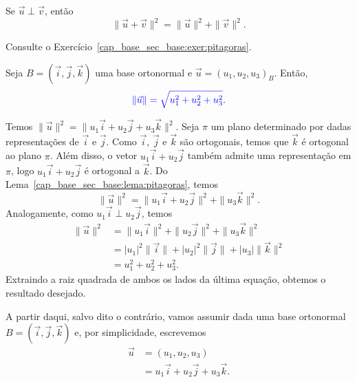\begin{lema}\label{cap_base_sec_base:lema:pitagoras}
  Se $\vec{u}\perp\vec{v}$, então 
  \begin{equation}
    \|\vec{u}+\vec{v}\|^2=\|\vec{u}\|^2+\|\vec{v}\|^2.
  \end{equation}
\end{lema}
\begin{demonstracao}
  Consulte o Exercício~\ref{cap_base_sec_base:exer:pitagoras}.
\end{demonstracao}

\begin{prop}\label{cap_base_sec_base:prop:norma}
  Seja $B = (\vec{i},\vec{j},\vec{k})$ uma base ortonormal e $\vec{u}=(u_1,u_2,u_3)_B$. Então, 
  \begin{equation}\color{blue}\|\vec{u}\|=\sqrt{u_1^2+u_2^2+u_3^2}.
  \end{equation}
\end{prop}
\begin{dem}
  Temos $\|\vec{u}\|^2 = \|u_1\vec{i}+u_2\vec{j}+u_3\vec{k}\|^2$. Seja $\pi$ um plano determinado por dadas representações de $\vec{i}$ e $\vec{j}$. Como $\vec{i}$, $\vec{j}$ e $\vec{k}$ são ortogonais, temos que $\vec{k}$ é ortogonal ao plano $\pi$. Além disso, o vetor $u_1\vec{i}+u_2\vec{j}$ também admite uma representação em $\pi$, logo $u_1\vec{i}+u_2\vec{j}$ é ortogonal a $\vec{k}$. Do Lema~\ref{cap_base_sec_base:lema:pitagoras}, temos
  \begin{equation}
    \|\vec{u}\|^2 = \|u_1\vec{i}+u_2\vec{j}\|^2 + \|u_3\vec{k}\|^2.
  \end{equation}
  Analogamente, como $u_1\vec{i}\perp u_2\vec{j}$, temos
  \begin{align}
    \|\vec{u}\|^2 &= \|u_1\vec{i}\|^2 + \|u_2\vec{j}\|^2 + \|u_3\vec{k}\|^2\\
                &= |u_1|^2\|\vec{i}\| + |u_2|^2\|\vec{j}\| + |u_3|\|\vec{k}\|^2\\
                &= u_1^2 + u_2^2 + u_3^2.
  \end{align}
  Extraindo a raiz quadrada de ambos os lados da última equação, obtemos o resultado desejado.
\end{dem}

A partir daqui, salvo dito o contrário, vamos assumir dada uma base ortonormal $B = (\vec{i}, \vec{j}, \vec{k})$ e, por simplicidade, escrevemos
\begin{align}
  \vec{u} &= (u_1, u_2, u_3)\\
          &= u_1\vec{i} + u_2\vec{j} + u_3\vec{k}.
\end{align}

